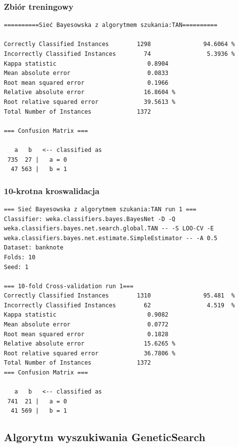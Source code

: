 \documentclass{classrep}
\begin{document}
\subsubsection*{Zbiór treningowy}
\scriptsize 
\begin{verbatim}
==========Sieć Bayesowska z algorytmem szukania:TAN==========

Correctly Classified Instances        1298               94.6064 %
Incorrectly Classified Instances        74                5.3936 %
Kappa statistic                          0.8904
Mean absolute error                      0.0833
Root mean squared error                  0.1966
Relative absolute error                 16.8604 %
Root relative squared error             39.5613 %
Total Number of Instances             1372     

=== Confusion Matrix ===

   a   b   <-- classified as
 735  27 |   a = 0
  47 563 |   b = 1
\end{verbatim} 
\normalsize
\subsubsection*{10-krotna kroswalidacja}
\scriptsize 
\begin{verbatim}
=== Sieć Bayesowska z algorytmem szukania:TAN run 1 ===
Classifier: weka.classifiers.bayes.BayesNet -D -Q
weka.classifiers.bayes.net.search.global.TAN -- -S LOO-CV -E
weka.classifiers.bayes.net.estimate.SimpleEstimator -- -A 0.5
Dataset: banknote
Folds: 10
Seed: 1

=== 10-fold Cross-validation run 1===
Correctly Classified Instances        1310               95.481  %
Incorrectly Classified Instances        62                4.519  %
Kappa statistic                          0.9082
Mean absolute error                      0.0772
Root mean squared error                  0.1828
Relative absolute error                 15.6265 %
Root relative squared error             36.7806 %
Total Number of Instances             1372     
=== Confusion Matrix ===

   a   b   <-- classified as
 741  21 |   a = 0
  41 569 |   b = 1
\end{verbatim} 
\normalsize

\subsection{Algorytm wyszukiwania GeneticSearch}
\end{document}
